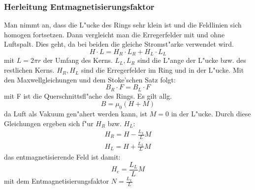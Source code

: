         \subsubsection*{Herleitung Entmagnetisierungsfaktor}
            Man nimmt an, dass die L"ucke des Rings sehr klein ist und die Feldlinien sich homogen
            fortsetzen. Dann vergleicht man die Erregerfelder mit und ohne Luftspalt. Dies geht, da
            bei beiden die gleiche Stromst"arke verwendet wird.
            \begin{equation}
                H \cdot L = H_R \cdot L_R + H_L \cdot L_L
            \end{equation}
            mit $L = 2 \pi r$ der Umfang des Kerns. $L_L, L_R$ sind die L"ange der L"ucke bzw. des restlichen Kerns.
            $H_R, H_L$ sind die Erregerfelder im Ring und in der L"ucke.
            Mit den Maxwellgleichungen und dem Stoke'schen Satz folgt:
            \begin{equation}
                B_R \cdot F = B_L \cdot F
            \end{equation}
            mit F ist die Querschnittsfl"ache des Rings. Es gilt allg.
            \begin{equation}
                B = \mu_0 (H + M)
            \end{equation}
            da Luft als Vakuum gen"ahert werden kann, ist $M=0$ in der L"ucke.
            Durch diese Gleichungen ergeben sich f"ur $H_R$ bzw. $H_L$:
            \begin{align*}
                H_R = H - \frac{L_L}{L} M\\
                H_L = H + \frac{L_L}{L} M
            \end{align*}
            das entmagnetisierende Feld ist damit:
            \begin{equation}
                H_e = \frac{L_L}{L} M
            \end{equation}
            mit dem Entmagnetisierungsfaktor $N = \frac{L_L}{L}$
